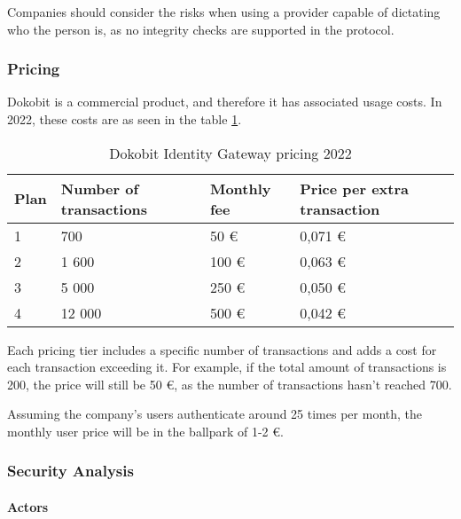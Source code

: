 Companies should consider the risks when using a provider capable of dictating who the person is, as no integrity checks are supported in the protocol.

\subsubsection{Pricing}

Dokobit is a commercial product, and therefore it has associated usage costs. In 2022, these costs are as seen in the table \ref{tab:dokobit-pricing}.

\begin{table}[h]
  \centering
  \caption{Dokobit Identity Gateway pricing 2022}
  \begin{tabular}{| l | l | l | l |}
    \hline
    \bf{Plan} & \bf{Number of transactions} & \bf{Monthly fee} & \bf{Price per extra transaction} \\
    \hline
    1         & 700                         & 50 €             & 0,071 €                          \\
    \hline
    2         & 1 600                       & 100 €            & 0,063 €                          \\
    \hline
    3         & 5 000                       & 250 €            & 0,050 €                          \\
    \hline
    4         & 12 000                      & 500 €            & 0,042 €                          \\
    \hline
  \end{tabular}
  \label{tab:dokobit-pricing}
\end{table}

Each pricing tier includes a specific number of transactions and adds a cost for each transaction exceeding it. For example, if the total amount of transactions is 200, the price will still be 50 €, as the number of transactions hasn't reached 700.

Assuming the company's users authenticate around 25 times per month, the monthly user price will be in the ballpark of 1-2 €.

\subsubsection{Security Analysis}

\paragraph{Actors}

